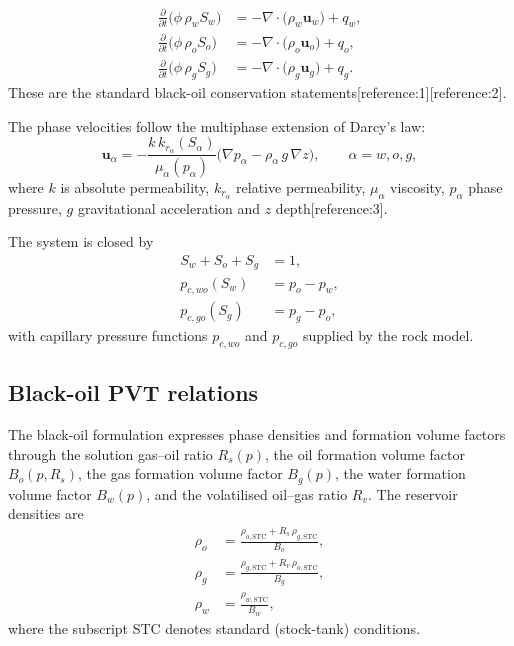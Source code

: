 \documentclass[10pt,a4paper]{article}
\newcommand{\pd}[2]{\frac{\partial #1}{\partial #2}}
\newcommand{\grad}{\nabla}
\newcommand{\divv}{\nabla\cdot}
\newcommand{\bo}{B_o}
\newcommand{\bw}{B_w}
\newcommand{\bg}{B_g}
\newcommand{\rs}{R_s}
\newcommand{\kr}{k_r}
\begin{document}
\begin{align}
  \pd{}{t}\bigl(\phi\,\rho_w S_w\bigr)
  &= -\divv\bigl(\rho_w \bm{u}_w\bigr) + q_w, \label{eq:cons-w}\\[2pt]
  \pd{}{t}\bigl(\phi\,\rho_o S_o\bigr)
  &= -\divv\bigl(\rho_o \bm{u}_o\bigr) + q_o, \label{eq:cons-o}\\[2pt]
  \pd{}{t}\bigl(\phi\,\rho_g S_g\bigr)
  &= -\divv\bigl(\rho_g \bm{u}_g\bigr) + q_g. \label{eq:cons-g}
\end{align}
These are the standard black-oil conservation statements[reference:1][reference:2].

The phase velocities follow the multiphase extension of Darcy's law:
\begin{equation}
  \bm{u}_\alpha
  = -\frac{k\,\kr_\alpha(S_\alpha)}{\mu_\alpha(p_\alpha)}
    \bigl(\grad p_\alpha - \rho_\alpha\, g\,\grad z\bigr),
  \qquad \alpha=w,o,g,
  \label{eq:darcy}
\end{equation}
where $k$ is absolute permeability, $\kr_\alpha$ relative permeability,
$\mu_\alpha$ viscosity, $p_\alpha$ phase pressure, $g$ gravitational
acceleration and $z$ depth[reference:3].

The system is closed by
\begin{align}
  S_w + S_o + S_g &= 1, \label{eq:sat}\\
  p_{c,wo}(S_w) &= p_o - p_w, \label{eq:pc-wo}\\
  p_{c,go}(S_g) &= p_g - p_o, \label{eq:pc-go}
\end{align}
with capillary pressure functions $p_{c,wo}$ and $p_{c,go}$ supplied by the
rock model.

\subsection{Black-oil PVT relations}

The black-oil formulation expresses phase densities and formation volume
factors through the solution gas--oil ratio $\rs(p)$, the oil formation volume
factor $\bo(p,\rs)$, the gas formation volume factor $\bg(p)$, the water
formation volume factor $\bw(p)$, and the volatilised oil--gas ratio $R_v$.
The reservoir densities are
\begin{align}
  \rho_o &= \frac{\rho_{o,\mathrm{STC}} + \rs\,\rho_{g,\mathrm{STC}}}{\bo}, \label{eq:rho-o}\\
  \rho_g &= \frac{\rho_{g,\mathrm{STC}} + R_v\,\rho_{o,\mathrm{STC}}}{\bg}, \label{eq:rho-g}\\
  \rho_w &= \frac{\rho_{w,\mathrm{STC}}}{\bw}, \label{eq:rho-w}
\end{align}
where the subscript STC denotes standard (stock-tank) conditions.
\end{document}

